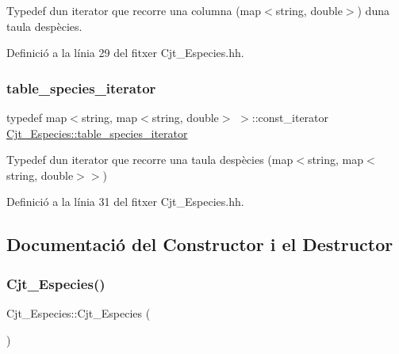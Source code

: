 Typedef d\textquotesingle{}un iterator que recorre una columna (map$<$string, double$>$) d\textquotesingle{}una taula d\textquotesingle{}espècies. 



Definició a la línia 29 del fitxer Cjt\+\_\+\+Especies.\+hh.

\mbox{\label{class_cjt___especies_a5da209bb73685ff7a89041202bcdd8c7}} 
\subsubsection{\texorpdfstring{table\+\_\+species\+\_\+iterator}{table\_species\_iterator}}
{\footnotesize\ttfamily typedef map$<$string, map$<$string, double$>$ $>$\+::const\+\_\+iterator \hyperlink{class_cjt___especies_a5da209bb73685ff7a89041202bcdd8c7}{Cjt\+\_\+\+Especies\+::table\+\_\+species\+\_\+iterator}\hspace{0.3cm}{\ttfamily [private]}}



Typedef d\textquotesingle{}un iterator que recorre una taula d\textquotesingle{}espècies (map$<$string, map$<$string, double$>$$>$) 



Definició a la línia 31 del fitxer Cjt\+\_\+\+Especies.\+hh.



\subsection{Documentació del Constructor i el Destructor}
\mbox{\label{class_cjt___especies_ae423b9d5a456158136c17d9210c90c2e}} 
\subsubsection{\texorpdfstring{Cjt\+\_\+\+Especies()}{Cjt\_Especies()}}
{\footnotesize\ttfamily Cjt\+\_\+\+Especies\+::\+Cjt\+\_\+\+Especies (\begin{DoxyParamCaption}{ }\end{DoxyParamCaption})}



